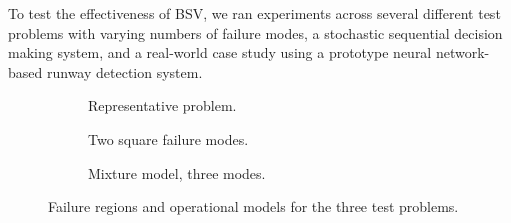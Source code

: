 To test the effectiveness of BSV, we ran experiments across several different test problems with varying numbers of failure modes, a stochastic sequential decision making system, and a real-world case study using a prototype neural network-based runway detection system.


\begin{figure}[b!]
    \centering

    \begin{subfigure}[b]{0.32\textwidth}
        \centering
        
        \caption{Representative problem.}
        \label{fig:toy_rep}
    \end{subfigure}
    \hfill
    \begin{subfigure}[b]{0.32\textwidth}
        \centering
        
        \caption{Two square failure modes.}
        \label{fig:toy_squares}
    \end{subfigure}
    \hfill
    \begin{subfigure}[b]{0.32\textwidth}
        \centering
        
        \caption{Mixture model, three modes.}
        \label{fig:toy_mixture}
    \end{subfigure}
    
    \caption{Failure regions and operational models for the three test problems.}
    \label{fig:toys}
\end{figure}


